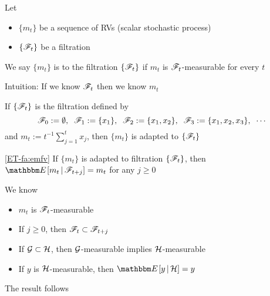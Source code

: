 \begin{frame}

    \vspace{2em}
    Let 
    \begin{itemize}
        \item $\{m_t\}$ be a sequence of RVs (scalar stochastic process)
        \item $\{\mathscr F_t\}$ be a filtration
    \end{itemize}

    We say $\{m_t\}$ is  to the filtration $\{\mathscr F_t\}$ if
    $m_t$ is $\mathscr F_t$-measurable for every $t$

    \vspace{1em}
    Intuition: If we know $\mathscr F_t$ then we know $m_t$
    
\end{frame}

\begin{frame}

    \vspace{2em}
    \Eg If $\{\mathscr F_t\}$ is the filtration defined by 
        \begin{equation*}
            \mathscr F_0 := \emptyset, \; \;
            \mathscr F_1 := \{x_1\}, \; \;
            \mathscr F_2 := \{x_1, x_2\}, \; \;
            \mathscr F_3 := \{x_1, x_2, x_3\}, \;\;
            \cdots
        \end{equation*}
        and $m_t := t^{-1} \sum_{j=1}^t x_j$, then $\{m_t\}$ is adapted to
        $\{\mathscr F_t\}$
        
\end{frame}

\begin{frame}

    \vspace{2em}
    \Fact\textcolor{Brown}{\eqref{ET-fa:emfv}}
        If $\{m_t\}$ is adapted to filtration $\{\mathscr F_t\}$, then $\EE[m_t \given \fF_{t+j}] =
        m_t$ for any $j \geq 0$
        
    \Prf
        We know
        \begin{itemize}
            \item $m_t$ is $\mathscr F_t$-measurable
            \item If $j \geq 0$, then $\mathscr F_t \subset \mathscr F_{t+j}$
            \item If $\mathcal G \subset \mathcal H$, then $\mathcal G$-measurable implies
                $\mathcal H$-measurable
            \item If $y$ is $\mathcal H$-measurable, then $\EE[y \given \hH] = y$
        \end{itemize}
        The result follows
        
\end{frame}



